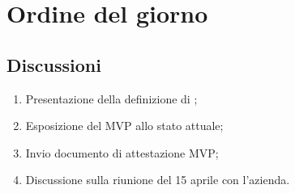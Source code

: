 \section{Ordine del giorno} \label{sec:agenda}
\subsection{Discussioni} \label{subsec:discussione}
\begin{enumerate}

    \item Presentazione della definizione di ;
    \item Esposizione del MVP allo stato attuale;
    \item Invio documento di attestazione MVP;
    \item Discussione sulla riunione del 15 aprile con l'azienda.
    
\end{enumerate}

